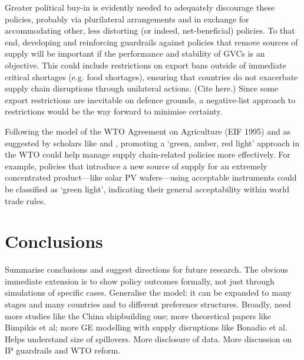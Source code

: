 \documentclass{article}
\begin{document}
Greater political buy-in is evidently needed to adequately discourage these policies, probably via plurilateral arrangements and in exchange for accommodating other, less distorting (or indeed, net-beneficial) policies. To that end, developing and reinforcing guardrails against policies that remove sources of supply will be important if the performance and stability of GVCs is an objective. This could include restrictions on export bans outside of immediate critical shortages (e.g. food shortages), ensuring that countries do not exacerbate supply chain disruptions through unilateral actions. (Cite \textcite{bown_how_2023} here.) Since some export restrictions are inevitable on defence grounds, a negative-list approach to restrictions would be the way forward to minimise certainty.

Following the model of the WTO Agreement on Agriculture (EIF 1995) and as suggested by scholars like \textcite{aguayo_ayala_preserving_2005} and \textcite{bown_wtoing_2019}, promoting a `green, amber, red light' approach in the WTO could help manage supply chain-related policies more effectively. For example, policies that introduce a new source of supply for an extremely concentrated product---like solar PV wafers---using acceptable instruments could be classified as `green light', indicating their general acceptability within world trade rules.

\section{Conclusions}

Summarise conclusions and suggest directions for future research. The obvious immediate extension is to show policy outcomes formally, not just through simulations of specific cases. Generalise the model: it can be expanded to many stages and many countries and to different preference structures. Broadly, need more studies like the China shipbuilding one; more theoretical papers like Bimpikis et al; more GE modelling with supply disruptions like Bonadio et al. Helps understand size of spillovers. More disclosure of data. More discussion on IP guardrails and WTO reform.

\printbibliography
\end{document}
